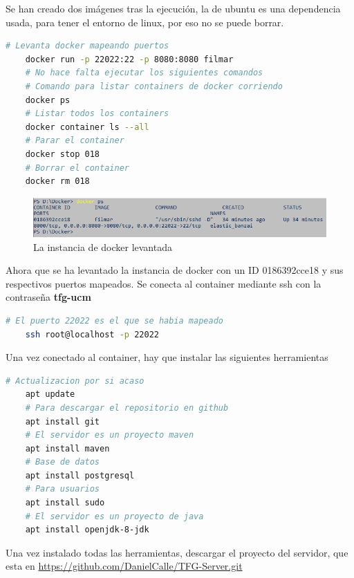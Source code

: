 Se han creado dos imágenes tras la ejecución, la de ubuntu es una dependencia usada, para tener el entorno de linux, por eso no se puede borrar.

\begin{lstlisting}[language=bash, caption=Levantamiento de la instancia de docker]
    # Levanta docker mapeando puertos
    docker run -p 22022:22 -p 8080:8080 filmar 
    # No hace falta ejecutar los siguientes comandos
    # Comando para listar containers de docker corriendo
    docker ps 
    # Listar todos los containers
    docker container ls --all 
    # Parar el container
    docker stop 018 
    # Borrar el container
    docker rm 018 
\end{lstlisting}

\begin{figure}[H]
    \centering
    \includegraphics[width=6in]{figures/appendix-A/list-docker-containers.png}
    \caption{La instancia de docker levantada}
\end{figure}

Ahora que se ha levantado la instancia de docker con un ID 0186392cce18 y sus respectivos puertos mapeados.
Se conecta al container mediante ssh con la contraseña \textbf{tfg-ucm}

\begin{lstlisting}[language=bash, caption=Conexión ssh]
    # El puerto 22022 es el que se habia mapeado
    ssh root@localhost -p 22022
\end{lstlisting}

Una vez conectado al container, hay que instalar las siguientes herramientas

\begin{lstlisting}[language=bash, caption=Instalaciones]
    # Actualizacion por si acaso
    apt update 
    # Para descargar el repositorio en github
    apt install git
    # El servidor es un proyecto maven
    apt install maven
    # Base de datos
    apt install postgresql
    # Para usuarios
    apt install sudo
    # El servidor es un proyecto de java
    apt install openjdk-8-jdk
\end{lstlisting}

Una vez instalado todas las herramientas, descargar el proyecto del servidor,
que esta en \url{https://github.com/DanielCalle/TFG-Server.git}

